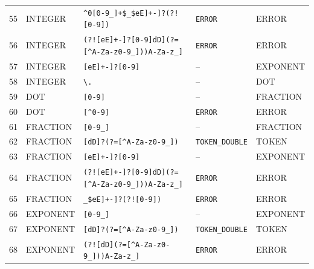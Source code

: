 \documentclass[a4paper,11pt]{article}
\begin{document}
\begin{landscape}
{\begin{longtable}{@{}r >{\raggedright\arraybackslash}p{4.0cm} >{\raggedright\arraybackslash}p{9.8cm} >{\raggedright\arraybackslash}p{5.4cm}>{\raggedright\arraybackslash}p{4.0cm}@{}}
55 & INTEGER & \texttt{\textasciicircum{}0{[}0-{}9\_{]}\allowbreak{}+\$\textbar{}\allowbreak{}\_\$\textbar{}\allowbreak{}{[}eE{]}\allowbreak{}{[}+-{}{]}\allowbreak{}?(?!{[}0-{}9{]}\allowbreak{})\allowbreak{}} & \texttt{ERROR} & ERROR \\
56 & INTEGER & \texttt{(?!{[}eE{]}\allowbreak{}{[}+-{}{]}\allowbreak{}?{[}0-{}9{]}\allowbreak{}\textbar{}\allowbreak{}{[}dD{]}\allowbreak{}(?={[}\textasciicircum{}A-{}Za-{}z0-{}9\_{]}\allowbreak{})\allowbreak{})\allowbreak{}{[}A-{}Za-{}z\_{]}\allowbreak{}} & \texttt{ERROR} & ERROR \\
57 & INTEGER & \texttt{{[}eE{]}\allowbreak{}{[}+-{}{]}\allowbreak{}?{[}0-{}9{]}\allowbreak{}} & -- & EXPONENT \\
58 & INTEGER & \texttt{\textbackslash{}.} & -- & DOT \\
59 & DOT & \texttt{{[}0-{}9{]}\allowbreak{}} & -- & FRACTION \\
60 & DOT & \texttt{{[}\textasciicircum{}0-{}9{]}\allowbreak{}} & \texttt{ERROR} & ERROR \\
61 & FRACTION & \texttt{{[}0-{}9\_{]}\allowbreak{}} & -- & FRACTION \\
62 & FRACTION & \texttt{{[}dD{]}\allowbreak{}?(?={[}\textasciicircum{}A-{}Za-{}z0-{}9\_{]}\allowbreak{})\allowbreak{}} & \texttt{TOKEN\_DOUBLE} & TOKEN \\
63 & FRACTION & \texttt{{[}eE{]}\allowbreak{}{[}+-{}{]}\allowbreak{}?{[}0-{}9{]}\allowbreak{}} & -- & EXPONENT \\
64 & FRACTION & \texttt{(?!{[}eE{]}\allowbreak{}{[}+-{}{]}\allowbreak{}?{[}0-{}9{]}\allowbreak{}\textbar{}\allowbreak{}{[}dD{]}\allowbreak{}(?={[}\textasciicircum{}A-{}Za-{}z0-{}9\_{]}\allowbreak{})\allowbreak{})\allowbreak{}{[}A-{}Za-{}z\_{]}\allowbreak{}} & \texttt{ERROR} & ERROR \\
65 & FRACTION & \texttt{\_\$\textbar{}\allowbreak{}{[}eE{]}\allowbreak{}{[}+-{}{]}\allowbreak{}?(?!{[}0-{}9{]}\allowbreak{})\allowbreak{}} & \texttt{ERROR} & ERROR \\
66 & EXPONENT & \texttt{{[}0-{}9\_{]}\allowbreak{}} & -- & EXPONENT \\
67 & EXPONENT & \texttt{{[}dD{]}\allowbreak{}?(?={[}\textasciicircum{}A-{}Za-{}z0-{}9\_{]}\allowbreak{})\allowbreak{}} & \texttt{TOKEN\_DOUBLE} & TOKEN \\
68 & EXPONENT & \texttt{(?!{[}dD{]}\allowbreak{}(?={[}\textasciicircum{}A-{}Za-{}z0-{}9\_{]}\allowbreak{})\allowbreak{})\allowbreak{}{[}A-{}Za-{}z\_{]}\allowbreak{}} & \texttt{ERROR} & ERROR \\

\end{longtable}}
\end{landscape}
\end{document}
